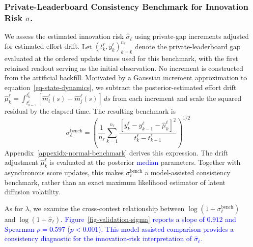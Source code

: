 \documentclass[mnsc]{informs3}
\begin{document}
\subsubsection{Private-Leaderboard Consistency Benchmark for Innovation Risk $\sigma$.}
{We assess the estimated innovation risk $\hat\sigma_\ell$ using private-gap increments adjusted for estimated effort drift.}
Let $(t^\ell_k,y^\ell_k)_{k=0}^{n_\ell}$ denote the private-leaderboard gap evaluated at the ordered update times used for this benchmark, {with the first retained readout serving as the initial observation. No increment is constructed from the artificial backfill.}
Motivated by a Gaussian increment approximation to equation~\eqref{eq-state-dynamics}, we subtract the posterior-estimated effort drift $\hat\mu_k^\ell=\int_{t^\ell_{k-1}}^{t^\ell_k}[\hat m_i^\ell(s)-\hat m_j^\ell(s)]\,ds$ from each increment and scale the squared residual by the elapsed time. {The resulting benchmark is}
\begin{equation*}
\sigma^{\text{bench}}_\ell = \left(\frac{1}{n_\ell}\sum_{k=1}^{n_\ell}\frac{\left[y^\ell_k-y^\ell_{k-1}-\hat\mu^\ell_k\right]^2}{t^\ell_k-t^\ell_{k-1}}\right)^{1/2}
\end{equation*}
{Appendix~\ref{appexidx-normal-benchmark} derives this expression. The drift adjustment $\hat\mu_k^\ell$ is evaluated at the posterior \textcolor{blue}{median} parameters. Together with asynchronous score updates, this makes $\sigma_\ell^{\mathrm{bench}}$ a model-assisted consistency benchmark, rather than an exact maximum likelihood estimator of latent diffusion volatility.}

{As for $\lambda$, we examine the cross-contest relationship between $\log(1+\sigma_\ell^{\mathrm{bench}})$ and $\log(1+\hat\sigma_\ell)$.}
\textcolor{blue}{Figure~\ref{fig-validation-sigma} reports a slope of $0.912$ and Spearman $\rho=0.597$ ($p<0.001$). This model-assisted comparison provides a consistency diagnostic for the innovation-risk interpretation of $\hat\sigma_\ell$.}
\end{document}
